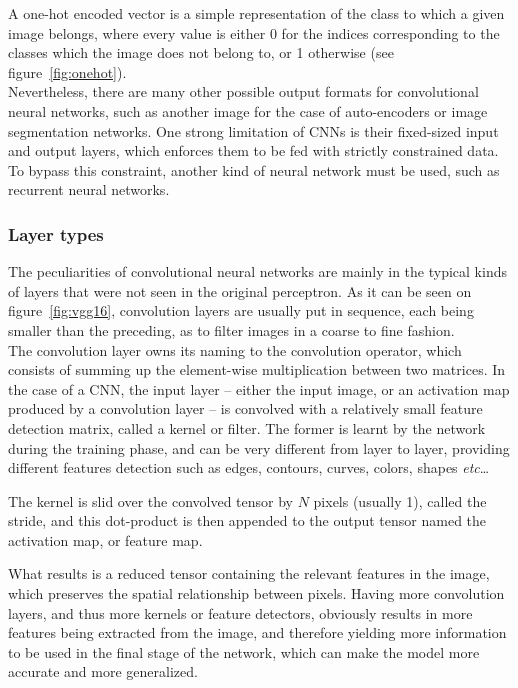 A one-hot encoded vector is a simple representation of the class to which a
given image belongs, where every value is either 0 for the indices
corresponding to the classes which the image does not belong to, or 1 otherwise
(see figure~\ref{fig:onehot}).\\

Nevertheless, there are many other possible output formats for convolutional
neural networks, such as another image for the case of auto-encoders or image
segmentation networks. One strong limitation of CNNs is their fixed-sized
input and output layers, which enforces them to be fed with strictly
constrained data. To bypass this constraint, another kind of neural network
must be used, such as recurrent neural networks.

	\subsubsection{Layer types}

The peculiarities of convolutional neural networks are mainly in the typical
kinds of layers that were not seen in the original perceptron. As it can be seen
on figure~\ref{fig:vgg16}, convolution layers are usually put in sequence, each
being smaller than the preceding, as to filter images in a coarse to fine
fashion.\\

The convolution layer owns its naming to the convolution operator, which
consists of summing up the element-wise multiplication between two matrices. In
the case of a CNN, the input layer -- either the input image, or an activation
map produced by a convolution layer -- is convolved with a relatively small
feature detection matrix, called a kernel or filter. The former is learnt by the
network during the training phase, and can be very different from layer to
layer, providing different features detection such as edges, contours, curves,
colors, shapes \emph{etc}\ldots

The kernel is slid over the convolved tensor by $N$ pixels (usually 1), called
the stride, and this dot-product is then appended to the output tensor named
the activation map, or feature map.

What results is a reduced tensor containing the relevant features in the image,
which preserves the spatial relationship between pixels. Having more convolution
layers, and thus more kernels or feature detectors, obviously results in more
features being extracted from the image, and therefore yielding more information
to be used in the final stage of the network, which can make the model more
accurate and more generalized.

